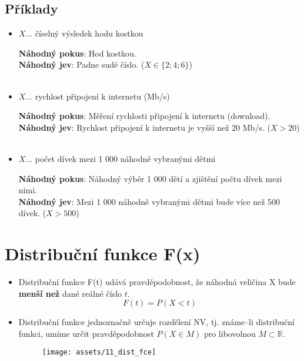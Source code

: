 \subsection*{Příklady}
\begin{itemize}
    \item[]	\begin{center}
              $X$... číselný výsledek hodu kostkou\\
          \end{center}
          \textbf{Náhodný pokus}: Hod kostkou. \\
          \textbf{Náhodný jev}: Padne sudé číslo. ($X \in \{2;4;6\}$) \\\\

    \item[]	\begin{center}
              $X$... rychlost připojení k internetu (Mb/s) \\
          \end{center}
          \textbf{Náhodný pokus}: Měření rychlosti připojení k internetu (download). \\
          \textbf{Náhodný jev}: Rychlost připojení k internetu je vyšší než 20 Mb/s.  ($X > 20$)\\\\

    \item[]	\begin{center}
              $X$... počet dívek mezi 1 000 náhodně vybranými dětmi \\
          \end{center}
          \textbf{Náhodný pokus}: Náhodný výběr 1 000 dětí a zjištění počtu dívek mezi nimi. \\
          \textbf{Náhodný jev}: Mezi 1 000 náhodně vybranými dětmi bude více než 500 dívek. ($X > 500$)
\end{itemize}





\section{Distribuční funkce F(x)}
\begin{itemize}
    \item Distribuční funkce F(t) udává pravděpodobnost, že náhodná veličina X bude \textbf{menší než} dané reálné číslo $t$.
          $$F(t) = P(X <t)$$
    \item Distribuční funkce jednoznačně určuje rozdělení NV, tj. známe--li distribuční funkci, umíme určit pravděpodobnost $P(X \in M)$ pro libovolnou $M\subset \mathbb{R}$.
          \begin{figure}[H]
              \centering
              \texttt{[image: assets/11\_dist\_fce]}
          \end{figure}
\end{itemize}

